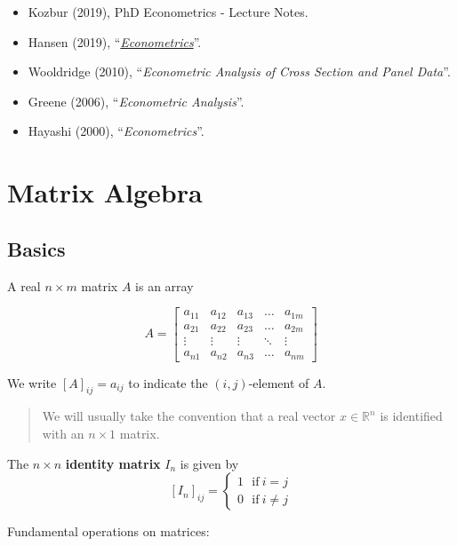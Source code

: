 \documentclass[12pt,]{book}
\providecommand{\tightlist}{%
  \setlength{\itemsep}{0pt}\setlength{\parskip}{0pt}}
\begin{document}
\begin{itemize}
\tightlist
\item
  Kozbur (2019), PhD Econometrics - Lecture Notes.
\item
  Hansen (2019), ``\emph{\href{https://www.ssc.wisc.edu/~bhansen/econometrics/Econometrics.pdf}{Econometrics}}''.
\item
  Wooldridge (2010), ``\emph{Econometric Analysis of Cross Section and Panel Data}''.
\item
  Greene (2006), ``\emph{Econometric Analysis}''.
\item
  Hayashi (2000), ``\emph{Econometrics}''.
\end{itemize}

\hypertarget{appendix1}{%
\chapter{Matrix Algebra}\label{appendix1}}

\hypertarget{basics}{%
\section{Basics}\label{basics}}

A real \(n \times m\) matrix \(A\) is an array

\[
  A=
  \begin{bmatrix}
  a_{11} & a_{12} & a_{13} & \dots  & a_{1m} \\
  a_{21} & a_{22} & a_{23} & \dots  & a_{2m} \\
  \vdots & \vdots & \vdots & \ddots & \vdots \\
  a_{n1} & a_{n2} & a_{n3} & \dots  & a_{nm}
  \end{bmatrix}
\]

We write \([A]_ {ij} = a_ {ij}\) to indicate the \((i,j)\)-element of \(A\).

\begin{quote}
We will usually take the convention that a real vector \(x \in \mathbb R^n\) is identified with an \(n \times 1\) matrix.
\end{quote}

The \(n \times n\) \textbf{identity matrix} \(I_n\) is given by\\
\[
  [I_n] _ {ij} = \begin{cases} 1 \ \ \ \text{if} \ i=j \\
  0 \ \ \ \text{if} \ i \neq j \end{cases}
\]

Fundamental operations on matrices:
\end{document}

